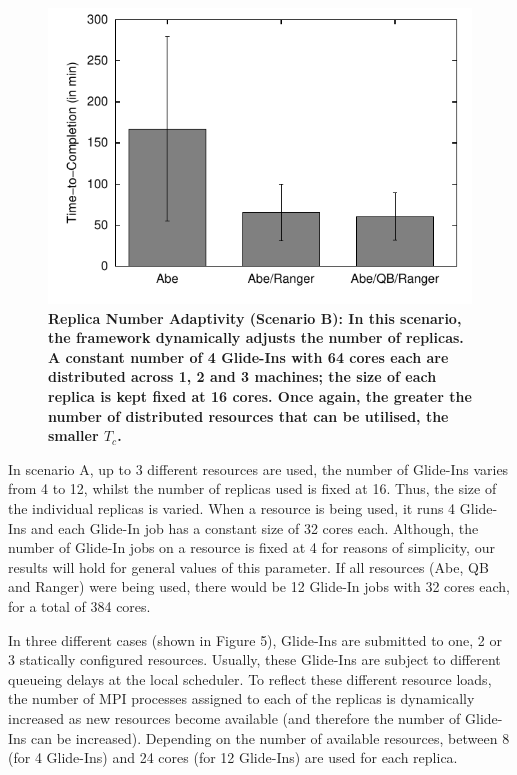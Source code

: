 \documentclass{rspublic}
\begin{document}
\begin{figure}[h]
\begin{minipage}[t]{.485\textwidth}
\begin{center}
      \includegraphics[width=\textwidth]{performance/perf_distributed_number_replica.pdf}
      \caption{\footnotesize \bf Replica Number Adaptivity (Scenario
        B): In this scenario, the framework dynamically adjusts the
        number of replicas.  A constant number of 4 Glide-Ins with 64
        cores each are distributed across 1, 2 and 3 machines; the
        size of each replica is kept fixed at 16 cores. Once again,
        the greater the number of distributed resources that can be
        utilised, the smaller $T_{c}$.}
      \label{fig:performance_perf_distributed_B}
    \end{center}
  \end{minipage}
  \hfill
\end{figure}


In scenario A, up to 3 different resources are used, the number of
Glide-Ins varies from 4 to 12, whilst the number of replicas used is
fixed at 16. Thus, the size of the individual replicas is varied.  
When a resource is being used, it runs 4 Glide-Ins and each Glide-In job
has a constant size of 32 cores each.  Although, the number of
Glide-In jobs on a resource is fixed at 4 for reasons of simplicity,
our results will hold for general values of this parameter. If all
resources (Abe, QB and Ranger) were being used, there would be 12
Glide-In jobs with 32 cores each, for a total of 384 cores.

In three different cases (shown in Figure 5), Glide-Ins are submitted
to one, 2 or 3 statically configured resources. Usually, these
Glide-Ins are subject to different queueing delays at the local
scheduler. To reflect these different resource loads, the number of
MPI processes assigned to each of the replicas is dynamically
increased as new resources become available (and therefore the number
of Glide-Ins can be increased). Depending on the number of available
resources, between 8 (for 4 Glide-Ins) and 24 cores (for 12 Glide-Ins)
are used for each replica.
\end{document}
